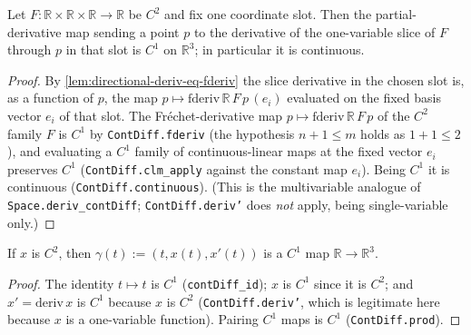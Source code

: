 \begin{lemma}
    \label{lem:partial-deriv-contdiff}
    \leanok
    Let $F : \mathbb{R} \times \mathbb{R} \times \mathbb{R} \to \mathbb{R}$ be
    $C^2$ and fix one coordinate slot. Then the partial-derivative map sending a
    point $p$ to the derivative of the one-variable slice of $F$ through $p$ in
    that slot is $C^1$ on $\mathbb{R}^3$; in particular it is continuous.
\end{lemma}
\begin{proof}
    By \cref{lem:directional-deriv-eq-fderiv} the slice derivative in the chosen
    slot is, as a function of $p$, the map
    $p \mapsto \mathrm{fderiv}\,\mathbb{R}\,F\,p\,(e_i)$ evaluated on the fixed
    basis vector $e_i$ of that slot. The Fr\'echet-derivative map
    $p \mapsto \mathrm{fderiv}\,\mathbb{R}\,F\,p$ of the $C^2$ family $F$ is $C^1$
    by \texttt{ContDiff.fderiv} (the hypothesis $n+1\le m$ holds as $1+1\le 2$),
    and evaluating a $C^1$ family of continuous-linear maps at the fixed vector
    $e_i$ preserves $C^1$ (\texttt{ContDiff.clm\_apply} against the constant map
    $e_i$). Being $C^1$ it is continuous (\texttt{ContDiff.continuous}). (This is
    the multivariable analogue of \texttt{Space.deriv\_contDiff};
    \texttt{ContDiff.deriv'} does \emph{not} apply, being single-variable only.)
\end{proof}

\begin{lemma}
    \label{lem:curve-contdiff}
    \leanok
    If $x$ is $C^2$, then $\gamma(t) := (t, x(t), x'(t))$ is a $C^1$ map
    $\mathbb{R} \to \mathbb{R}^3$.
\end{lemma}
\begin{proof}
    The identity $t \mapsto t$ is $C^1$ (\texttt{contDiff\_id}); $x$ is $C^1$
    since it is $C^2$; and $x' = \mathrm{deriv}\,x$ is $C^1$ because $x$ is $C^2$
    (\texttt{ContDiff.deriv'}, which is legitimate here because $x$ is a
    one-variable function). Pairing $C^1$ maps is $C^1$ (\texttt{ContDiff.prod}).
\end{proof}

